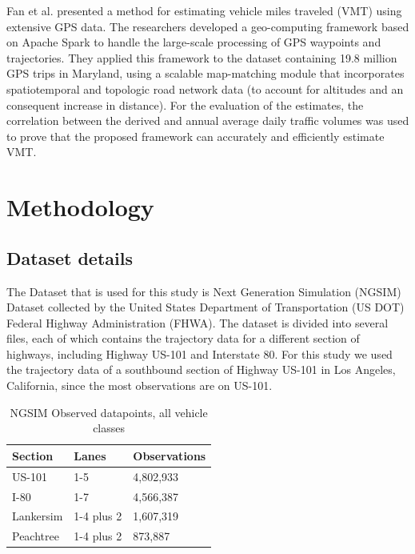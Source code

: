 \documentclass[11pt]{uonthesis}
\begin{document}
Fan et al.\cite{FAN2019298} presented a method for estimating vehicle miles traveled (VMT) using extensive GPS data. The researchers developed a geo-computing framework based on Apache Spark to handle the large-scale processing of GPS waypoints and trajectories. They applied this framework to the dataset containing 19.8 million GPS trips in Maryland, using a scalable map-matching module that incorporates spatiotemporal and topologic road network data (to account for altitudes and an consequent increase in distance). For the evaluation of the estimates, the correlation between the derived and annual average daily traffic volumes was used to prove that the proposed framework can accurately and efficiently estimate VMT.

\chapter{Methodology}
\section{Dataset details}

The Dataset that is used for this study is Next Generation Simulation (NGSIM) Dataset\cite{ngsim} collected by the United States Department of Transportation (US DOT) Federal Highway Administration (FHWA). The dataset is divided into several files, each of which contains the trajectory data for a different section of highways, including Highway US-101 and Interstate 80. For this study we used the trajectory data of a southbound section of Highway US-101 in Los Angeles, California, since the most observations are on US-101.

\begin{table}[ht!]
    \centering
    \begin{tabular}{ |p{3cm}|p{3cm}|p{3cm}| }
        \hline
        Section & Lanes & Observations\\
        \hline
        US-101 & 1-5 & 4,802,933\\
        I-80 & 1-7 & 4,566,387\\ 
        Lankersim & 1-4 plus 2 & 1,607,319\\
        Peachtree & 1-4 plus 2 & 873,887\\
        \hline
    \end{tabular}
\caption{NGSIM Observed datapoints, all vehicle classes}
\end{table}
\end{document}
